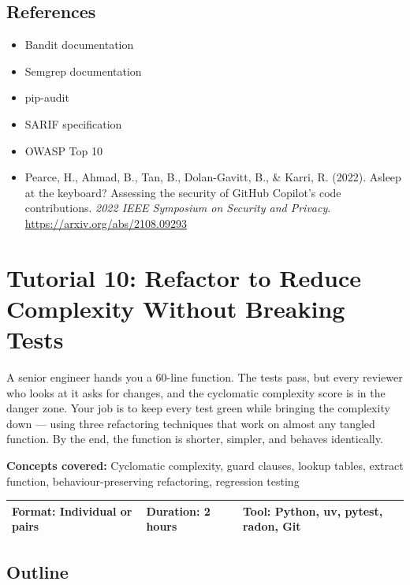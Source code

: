 \documentclass[11pt,a4paper]{book}
\begin{document}
\medskip

\section{References}

\begin{itemize}
  \item Bandit documentation
  \item Semgrep documentation
  \item pip-audit
  \item SARIF specification
  \item OWASP Top 10
  \item Pearce, H., Ahmad, B., Tan, B., Dolan-Gavitt, B., \& Karri, R. (2022). Asleep at the keyboard? Assessing the security of GitHub Copilot's code contributions. \textit{2022 IEEE Symposium on Security and Privacy}. \url{https://arxiv.org/abs/2108.09293}
\end{itemize}


\chapter{Tutorial 10: Refactor to Reduce Complexity Without Breaking Tests}

A senior engineer hands you a 60-line function. The tests pass, but every reviewer who looks at it asks for changes, and the cyclomatic complexity score is in the danger zone. Your job is to keep every test green while bringing the complexity down --- using three refactoring techniques that work on almost any tangled function. By the end, the function is shorter, simpler, and behaves identically.

\textbf{Concepts covered:} Cyclomatic complexity, guard clauses, lookup tables, extract function, behaviour-preserving refactoring, regression testing

\begin{tabular}{lll}
\hline
\textbf{Format:} Individual or pairs & \textbf{Duration:} 2 hours & \textbf{Tool:} Python, uv, pytest, radon, Git \\
\hline
\end{tabular}

\medskip

\section{Outline}
\end{document}
